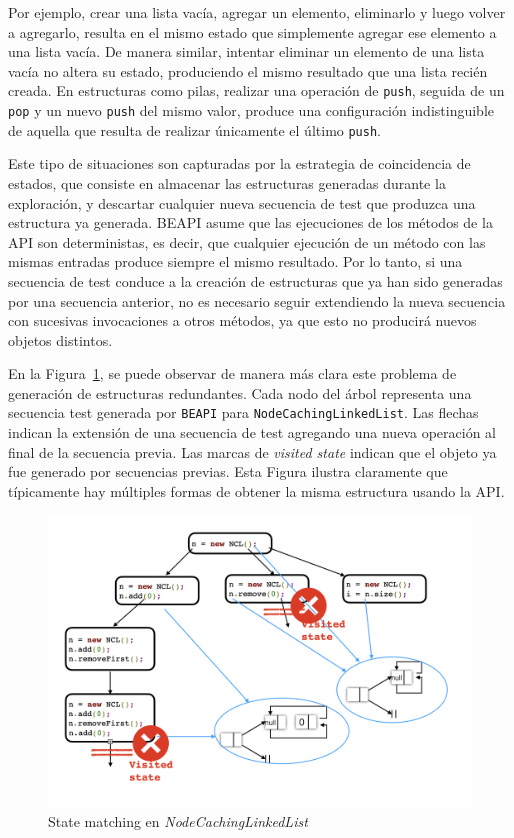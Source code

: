 Por ejemplo, crear una lista vacía, agregar un elemento, eliminarlo y luego volver a agregarlo, resulta en el mismo estado que simplemente agregar ese elemento a una lista vacía. 
De manera similar, intentar eliminar un elemento de una lista vacía no altera su estado, produciendo el mismo resultado que una lista recién creada. 
En estructuras como pilas, realizar una operación de \texttt{push}, seguida de un \texttt{pop} y un nuevo \texttt{push} del mismo valor, 
produce una configuración indistinguible de aquella que resulta de realizar únicamente el último \texttt{push}. 

Este tipo de situaciones son capturadas por la estrategia de coincidencia de
estados, que consiste en almacenar las estructuras generadas durante la
exploración, y descartar cualquier nueva secuencia de test que produzca una
estructura ya generada. 
\textsf{BEAPI} asume que las ejecuciones de los métodos de la API son
deterministas, es decir, que cualquier ejecución de un método con las mismas entradas produce 
siempre el mismo resultado. 
Por lo tanto, si una secuencia de test conduce a la creación de estructuras
que ya han sido generadas por una secuencia anterior, no es necesario seguir
extendiendo la nueva secuencia con sucesivas invocaciones a otros métodos, ya 
que esto no producirá nuevos objetos distintos.


En la Figura~\ref{fig:stateMatching}, se puede observar de manera más clara este
problema de generación de estructuras redundantes.
Cada nodo del árbol representa una secuencia test generada por \texttt{BEAPI}
para \texttt{NodeCachingLinkedList}. 
Las flechas indican la extensión de una secuencia de test agregando una nueva
operación al final de la secuencia previa.
Las marcas de \emph{visited state} indican que el objeto ya fue generado por
secuencias previas.
Esta Figura ilustra claramente que típicamente hay múltiples formas de obtener
la misma estructura usando la API.

\begin{figure}[H]
  \centering
  \includegraphics[width=1\textwidth]{images/stateMatching1.jpg}
  \caption{State matching en \emph{NodeCachingLinkedList}}
  \label{fig:stateMatching}
\end{figure}

